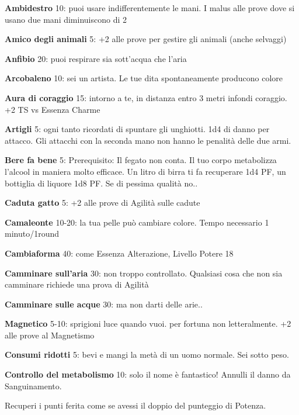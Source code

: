 \documentclass[a4paper,11pt,twoside,openany]{book}
\begin{document}
\textbf{Ambidestro}\label{Ambidestro} 10: puoi usare indifferentemente le mani. I malus alle prove dove si usano due mani diminuiscono di 2

\textbf{Amico degli animali} 5: +2 alle prove per gestire gli animali (anche selvaggi)

\textbf{Anfibio} 20: puoi respirare sia sott'acqua che l'aria

\textbf{Arcobaleno} 10: sei un artista. Le tue dita spontaneamente
producono colore

\textbf{Aura di coraggio} 15: intorno a te, in distanza entro 3 metri infondi coraggio. +2 TS vs Essenza Charme

\textbf{Artigli} 5: ogni tanto ricordati di spuntare gli unghiotti. 1d4 di danno per attacco. Gli attacchi con la seconda mano non hanno le penalità delle due armi.

\textbf{Bere fa bene} 5: Prerequisito: Il fegato non conta. Il tuo corpo metabolizza l'alcool in maniera molto efficace. Un litro di birra ti fa recuperare 1d4 PF, un bottiglia di liquore 1d8 PF. Se di pessima qualità no..

\textbf{Caduta gatto} 5: +2 alle prove di Agilità sulle cadute

\textbf{Camaleonte} 10-20: la tua pelle può cambiare colore. Tempo necessario 1 minuto/1round

\textbf{Cambiaforma} 40: come Essenza Alterazione, Livello Potere 18

\textbf{Camminare sull'aria} 30: non troppo controllato. Qualsiasi cosa che non sia camminare richiede una prova di Agilità

\textbf{Camminare sulle acque}  30: ma non darti delle arie..

\textbf{Magnetico} 5-10: sprigioni luce quando vuoi. per fortuna non letteralmente. +2 alle prove al Magnetismo

\textbf{Consumi ridotti} 5: bevi e mangi la metà di un uomo normale. Sei sotto peso.

\textbf{Controllo del metabolismo}  10: solo il nome è fantastico! Annulli il danno da Sanguinamento.

Recuperi i punti ferita come se avessi il doppio del punteggio di Potenza.
\end{document}
